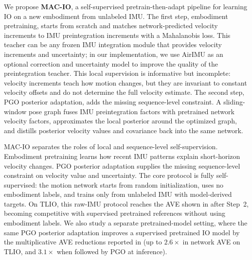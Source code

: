 We propose \textbf{MAC-IO}, a self-supervised pretrain-then-adapt pipeline for learning IO on a new embodiment from unlabeled IMU.
The first step, embodiment pretraining, starts from scratch and matches network-predicted velocity increments to IMU preintegration increments with a Mahalanobis loss.
This teacher can be any frozen IMU integration module that provides velocity increments and uncertainty; in our implementation, we use AirIMU as an optional correction and uncertainty model to improve the quality of the preintegration teacher.
This local supervision is informative but incomplete: velocity increments teach how motion changes, but they are invariant to constant velocity offsets and do not determine the full velocity estimate.
The second step, PGO posterior adaptation, adds the missing sequence-level constraint.
A sliding-window pose graph fuses IMU preintegration factors with pretrained network velocity factors, approximates the local posterior around the optimized graph, and distills posterior velocity values and covariance back into the same network.

MAC-IO separates the roles of local and sequence-level self-supervision.
Embodiment pretraining learns how recent IMU patterns explain short-horizon velocity changes.
PGO posterior adaptation supplies the missing sequence-level constraint on velocity value and uncertainty.
The core protocol is fully self-supervised: the motion network starts from random initialization, uses no embodiment labels, and trains only from unlabeled IMU with model-derived targets.
On TLIO, this raw-IMU protocol reaches the AVE shown in  after Step~2, becoming competitive with supervised pretrained references without using embodiment labels.
We also study a separate pretrained-model setting, where the same PGO posterior adaptation improves a supervised pretrained IO model by the multiplicative AVE reductions reported in  (up to $2.6\times$ in network AVE on TLIO, and $3.1\times$ when followed by PGO at inference).

